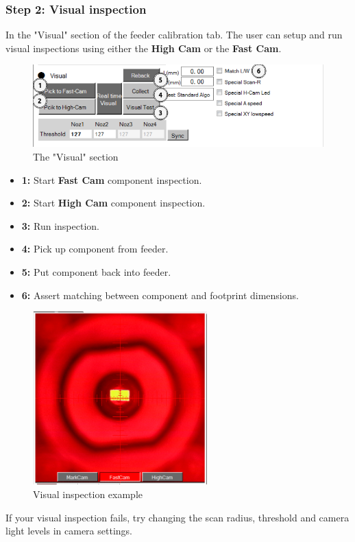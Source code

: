 \documentclass[a4paper,10pt]{report}
\begin{document}
\subsubsection{Step 2: Visual inspection}
In the "Visual" section of the feeder calibration tab. The user can setup and run visual inspections using either the \textbf{High Cam} or the \textbf{Fast Cam}.
 \begin{figure}[!htb]
 \centering
 \includegraphics[width=1\textwidth]{images/scrot25.png}
 \caption{The "Visual" section}
\end{figure}
\begin{itemize}
 \item \textbf{1:} Start \textbf{Fast Cam} component inspection.
 \item \textbf{2:} Start \textbf{High Cam} component inspection.
 \item \textbf{3:} Run inspection.
 \item \textbf{4:} Pick up component from feeder.
 \item \textbf{5:} Put component back into feeder.
 \item \textbf{6:} Assert matching between component and footprint dimensions.
\end{itemize}
 \begin{figure}[!htb]
 \centering
 \includegraphics[width=0.6\textwidth]{images/scrot26.png}
 \caption{Visual inspection example}
\end{figure}
\newpage
If your visual inspection fails, try changing the scan radius, threshold and camera light levels in camera settings.\\
\end{document}
